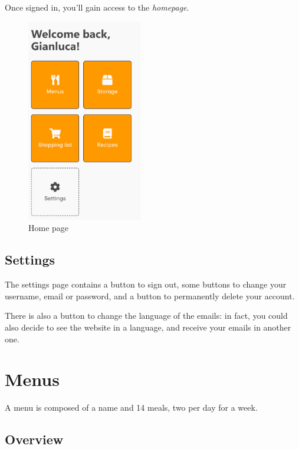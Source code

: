 \documentclass[12pt, a4paper]{report}
\begin{document}
    Once signed in, you'll gain access to the \emph{homepage}.

    \begin{figure}[H]
        \centering
        \includegraphics[width=0.45\textwidth]{assets/en/home.png}
        \caption{Home page}
    \end{figure}

    \section{Settings}

    The settings page contains a button to sign out, some buttons to change your username, email or password, and a button to permanently delete
    your account.

    There is also a button to change the language of the emails: in fact, you could also decide to see the website in a language, and
    receive your emails in another one.



    \chapter{Menus}

    A menu is composed of a name and 14 meals, two per day for a week.

    \section{Overview}
\end{document}
